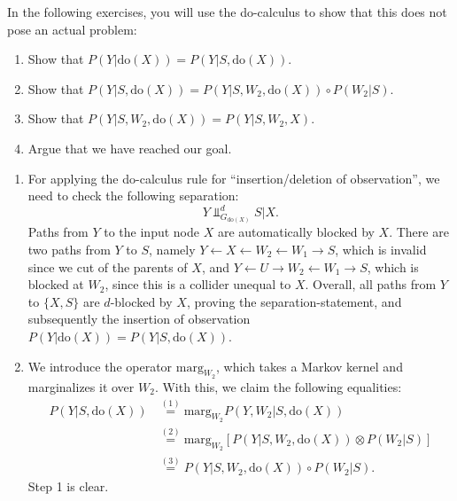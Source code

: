 \begin{enumerate}
  In the following exercises, you will use the do-calculus to show that this does not pose an actual problem:

  \begin{enumerate}
    \item Show that $P(Y | \text{do}(X)) = P(Y | S, \text{do}(X))$.
    \item Show that $P(Y | S, \text{do}(X)) = P(Y | S, W_2, \text{do}(X)) \circ P(W_2 | S)$.
    \item Show that  $P(Y | S, W_2, \text{do}(X)) = P(Y | S, W_2, X)$.
    \item Argue that we have reached our goal.
  \end{enumerate}

\begin{gradedsolution}
  \begin{enumerate}
    \item For applying the do-calculus rule for ``insertion/deletion of observation'', we need to check the following separation:
    \begin{equation*}
      Y \Perp_{G_{\text{do}(X)}}^{d} S | X.
    \end{equation*}
    Paths from $Y$ to the input node $X$ are automatically blocked by $X$.
    There are two paths from $Y$ to $S$, namely $Y \leftarrow X \leftarrow W_2 \leftarrow W_1 \rightarrow S$, which is invalid since we cut of the parents of $X$, and $Y \leftarrow U \rightarrow W_2 \leftarrow W_1 \rightarrow S$, which is blocked at $W_2$, since this is a collider unequal to $X$.
    Overall, all paths from $Y$ to $\{X, S\}$ are $d$-blocked by $X$, proving the separation-statement, and subsequently the insertion of observation $P(Y | \text{do}(X)) = P(Y | S, \text{do}(X))$.
    \item We introduce the operator $\text{marg}_{W_2}$, which takes a Markov kernel and marginalizes it over $W_2$.
    With this, we claim the following equalities:
    \begin{align*}
      P(Y | S, \text{do}(X)) & \overset{(1)} = \text{marg}_{W_2} P(Y, W_2 | S, \text{do}(X)) \\
      & \overset{(2)} = \text{marg}_{W_2}  \left[ P(Y | S, W_2, \text{do}(X)) \otimes P(W_2 | S) \right] \\
      & \overset{(3)} = P(Y | S, W_2, \text{do}(X)) \circ P(W_2 | S).
    \end{align*}
    Step 1 is clear.


\end{enumerate}
\end{gradedsolution}
\end{enumerate}

